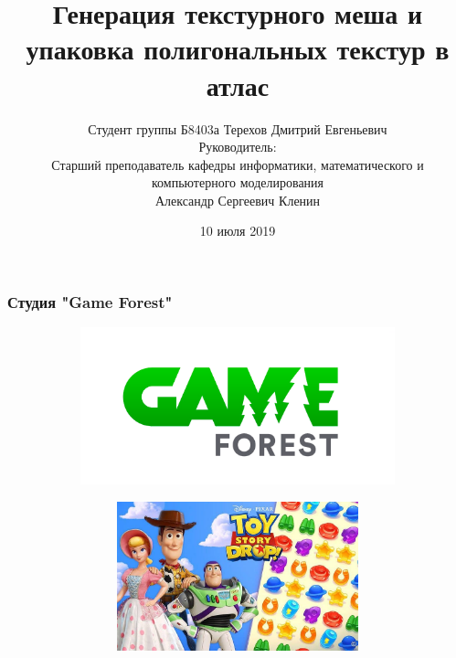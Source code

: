 \documentclass[10pt, unicode]{beamer}
\title{Генерация текстурного меша и упаковка полигональных текстур в атлас}
\author[Терехов Д.Е.]{Студент группы Б8403а Терехов Дмитрий Евгеньевич\\
Руководитель:\\
Старший преподаватель кафедры информатики, математического и компьютерного моделирования\\
Александр Сергеевич Кленин}
\date{10 июля 2019}
\begin{document}
    \begin{frame}[fragile]
        \titlepage
        \thispagestyle{empty}
    \end{frame}
    \begin{frame}
        \frametitle{Студия "Game Forest"}
        \begin{figure}[H]
            \centering
            \begin{subfigure}[l]{0.50\linewidth}
                \centering
                \includegraphics[scale=0.15]{GAMEFOREST.png}
            \end{subfigure}
            \begin{subfigure}{0.49\linewidth}
                \begin{subfigure}{\linewidth}
                    \centering
                    \includegraphics[scale=0.15]{TSD4.jpg}
                \end{subfigure}
                \begin{subfigure}{\linewidth}
                    \centering

\end{subfigure}
\end{subfigure}
\end{figure}
\end{frame}
\end{document}
